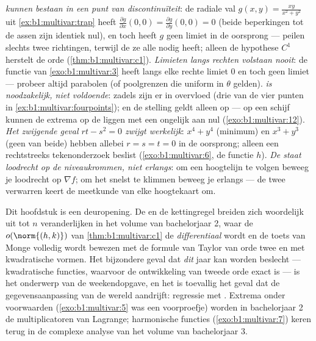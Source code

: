 \begin{remark}
\label{rem:b1:multivar:pitfalls}
\emph{ kunnen bestaan in een punt van
discontinuïteit}: de radiale val $g(x,y) = \frac{xy}{x^2+y^2}$ uit
\cref{ex:b1:multivar:trap} heeft $\frac{\partial g}{\partial
x}(0,0) = \frac{\partial g}{\partial y}(0,0) = 0$ (beide
beperkingen tot de assen zijn identiek nul), en toch heeft $g$
geen limiet in de oorsprong ---  peilen slechts
twee richtingen, terwijl de  ze alle nodig heeft;
alleen de hypothese $C^1$ herstelt de orde
(\cref{thm:b1:multivar:c1}).
\emph{Limieten langs rechten volstaan nooit}: de functie van
\cref{exo:b1:multivar:3} heeft langs elke rechte limiet $0$ en
toch geen limiet --- probeer altijd parabolen (of poolgrenzen die
uniform in $\theta$ gelden).
\emph{ is noodzakelijk, niet voldoende}: zadels zijn er in
overvloed (drie van de vier punten in
\cref{ex:b1:multivar:fourpoints}); en de stelling geldt alleen op
\emph{}  --- op een  schijf kunnen de
extrema op de  liggen met een  ongelijk aan nul
(\cref{exo:b1:multivar:12}).
\emph{Het zwijgende geval $rt - s^2 = 0$ zwijgt werkelijk}: $x^4 +
y^4$ (minimum) en $x^3 + y^3$ (geen van beide) hebben allebei $r =
s = t = 0$ in de oorsprong; alleen een rechtstreeks tekenonderzoek
beslist (\cref{exo:b1:multivar:6}, de functie $h$).
\emph{De  staat loodrecht op de niveaukrommen, niet
erlangs}: om een hoogtelijn te volgen beweeg je loodrecht op
$\nabla f$; om het snelst te klimmen beweeg je erlangs --- de twee
verwarren keert de meetkunde van elke hoogtekaart om.
\end{remark}

\begin{remark}
\label{rem:b1:multivar:whereused}
Dit hoofdstuk is een deuropening. De  en de kettingregel
breiden zich woordelijk uit tot $n$ veranderlijken in het volume
van bachelorjaar 2, waar de $o(\norm{(h,k)})$ van
\cref{thm:b1:multivar:c1} de \emph{differentiaal} wordt en de
toets van Monge volledig wordt bewezen met de formule van Taylor
van orde twee en met kwadratische vormen. Het bijzondere geval dat
\emph{dit} jaar kan worden beslecht --- kwadratische functies,
waarvoor de ontwikkeling van tweede orde exact is --- is het
onderwerp van de weekendopgave, en het is toevallig het geval dat
de gegevensaanpassing van de wereld aandrijft: regressie met
. Extrema onder voorwaarden
(\cref{exo:b1:multivar:5} was een voorproefje) worden in
bachelorjaar 2 de multiplicatoren van Lagrange; harmonische
functies (\cref{exo:b1:multivar:7}) keren terug in de complexe
analyse van het volume van bachelorjaar 3.
\end{remark}

